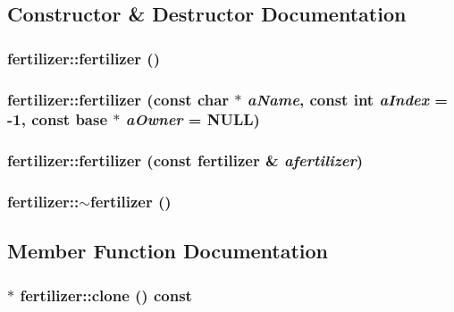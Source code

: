 \subsection{Constructor \& Destructor Documentation}
\hypertarget{classfertilizer_a1e4d38a4e98f1a0b39f1852de0d30383}{
\subsubsection[{fertilizer}]{\setlength{\rightskip}{0pt plus 5cm}fertilizer::fertilizer ()}}
\label{classfertilizer_a1e4d38a4e98f1a0b39f1852de0d30383}
\hypertarget{classfertilizer_adc4ae0decca7ec895def3a670f59c597}{
\subsubsection[{fertilizer}]{\setlength{\rightskip}{0pt plus 5cm}fertilizer::fertilizer (const char $\ast$ {\em aName}, \/  const int {\em aIndex} = {\ttfamily -\/1}, \/  const {\bf base} $\ast$ {\em aOwner} = {\ttfamily NULL})}}
\label{classfertilizer_adc4ae0decca7ec895def3a670f59c597}
\hypertarget{classfertilizer_ac7b4304100a388cedaad65c9eeaec128}{
\subsubsection[{fertilizer}]{\setlength{\rightskip}{0pt plus 5cm}fertilizer::fertilizer (const {\bf fertilizer} \& {\em afertilizer})}}
\label{classfertilizer_ac7b4304100a388cedaad65c9eeaec128}
\hypertarget{classfertilizer_acbb1a09db1bcb0818f3aaafd9cd0a7ea}{
\subsubsection[{$\sim$fertilizer}]{\setlength{\rightskip}{0pt plus 5cm}fertilizer::$\sim$fertilizer ()}}
\label{classfertilizer_acbb1a09db1bcb0818f3aaafd9cd0a7ea}


\subsection{Member Function Documentation}
\hypertarget{classfertilizer_aef152b18be864a2df64fd26fbed575e5}{
\subsubsection[{clone}]{ $\ast$ fertilizer::clone () const}}
\label{classfertilizer_aef152b18be864a2df64fd26fbed575e5}


